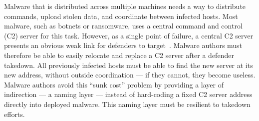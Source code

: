 \documentclass[10pt,sigconf,letterpaper]{acmart}
\begin{document}

Malware that is distributed across multiple machines needs a way to distribute commands, upload stolen 
data, and coordinate between infected hosts. Most malware, such as botnets or ransomware, uses a 
central command and control (C2) server for this task. However, as a single point of failure, a 
central C2 server presents an obvious weak link for defenders to target~\cite{kesari_deterring_2017}. 
Malware authors must therefore be able to easily relocate and replace a C2 server after a defender 
takedown. All previously infected hosts must be able to find the new server at its new address, 
without outside coordination --- if they cannot, they become useless. Malware authors avoid 
this ``sunk cost'' problem by providing a layer of indirection --- a naming layer --- instead of 
hard-coding a fixed C2 server address directly into deployed malware. This naming layer must be 
resilient to takedown efforts.
\end{document}
